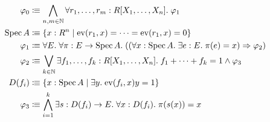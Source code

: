 \begin{align*}
  \varphi_0 &\vcentcolon\mspace{-1.2mu}\equiv
  \bigwedge_{n, m \in \mathbb{N}} \forall r_1, \dots, r_m : R[X_1, \dots, X_n].\; \varphi_1 \\
  \operatorname{Spec} A &\vcentcolon\mspace{-1.2mu}\equiv
  \{ x : R^n \mid \mathrm{ev}(r_1, x) = \dots = \mathrm{ev}(r_1, x) = 0 \} \\
  \varphi_1 &\vcentcolon\mspace{-1.2mu}\equiv
  \forall E.\; \forall \pi : E \to \operatorname{Spec} A.\;
  ((\forall x : \operatorname{Spec} A.\; \exists e : E.\; \pi(e) = x) \Rightarrow \varphi_2) \\
  \varphi_2 &\vcentcolon\mspace{-1.2mu}\equiv
  \bigvee_{k \in \mathbb{N}} \exists f_1, \dots, f_k : R[X_1, \dots, X_n].\;
  f_1 + \dots + f_k = 1 \land \varphi_3 \\
  D(f_i) &\vcentcolon\mspace{-1.2mu}\equiv \{ x : \operatorname{Spec} A \mid \exists y.\; \mathrm{ev}(f_i, x)y = 1 \} \\
  \varphi_3 &\vcentcolon\mspace{-1.2mu}\equiv
  \bigwedge_{i = 1}^k \exists s : D(f_i) \to E.\; \forall x : D(f_i).\; \pi(s(x)) = x
\end{align*}
